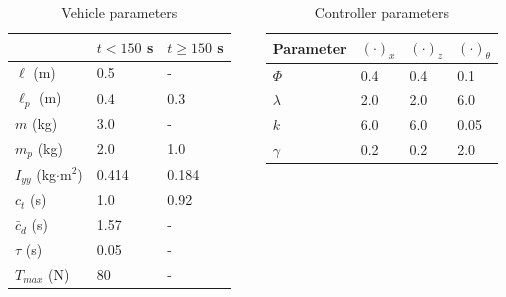 \documentclass{beamer}
\begin{document}
{\begin{columns}
\begin{column}{0.59\textwidth}
\begin{table}[h!]
	\centering
    \begin{tabular}{|lll|} \hline
    ~ & $t < 150$ s & $t \geq 150$ s \\ \hline
    $\ell$ (m) & 0.5 & - \\
    $\ell_p$ (m) & 0.4 & 0.3 \\
    $m$ (kg) & 3.0 & - \\
    $m_p$ (kg) & 2.0 & 1.0 \\
    $I_{yy}$ (kg$\cdot$m$^2$) & 0.414 & 0.184 \\ 
    $c_t$ (s) & 1.0 & 0.92 \\
    $\bar{c}_d$ (s) & 1.57 & - \\
    $\tau$ (s) & 0.05 & - \\
    $T_{max}$ (N) & 80 & - \\ \hline
    \end{tabular}
    \caption{Vehicle parameters}
    \label{plant_params_appendix}
\end{table}
\end{column}	
\begin{column}{0.4\textwidth}
\begin{table}[h!]
	\centering
    \begin{tabular}{|llll|} \hline
    Parameter & $(\cdot)_x$ & $(\cdot)_z$ & $(\cdot)_\theta$ \\ \hline
    $\Phi$ & 0.4 & 0.4 & 0.1 \\    
    $\lambda$ & 2.0 & 2.0 & 6.0 \\
    $k$ & 6.0 & 6.0 & 0.05 \\
    $\gamma$ & 0.2 & 0.2 & 2.0 \\ \hline
    \end{tabular}
    \caption{Controller parameters}
    \label{ctrl_params_appendix}
\end{table}
\end{column}
\end{columns}
\normalsize
}
\end{document}
